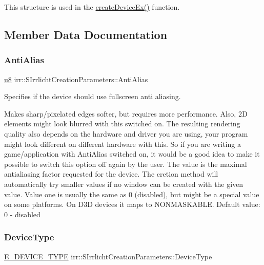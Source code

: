 This structure is used in the \hyperlink{namespaceirr_ae0a823eb5404bbf156965e7051798496}{create\+Device\+Ex()} function. 

\subsection{Member Data Documentation}
\mbox{\label{structirr_1_1SIrrlichtCreationParameters_a50602e6ae0cc3d79ca7df0aa8114e75a}} 
\subsubsection{\texorpdfstring{Anti\+Alias}{AntiAlias}}
{\footnotesize\ttfamily \hyperlink{namespaceirr_a646874f69af8ff87fc10201b0254a761}{u8} irr\+::\+S\+Irrlicht\+Creation\+Parameters\+::\+Anti\+Alias}



Specifies if the device should use fullscreen anti aliasing. 

Makes sharp/pixelated edges softer, but requires more performance. Also, 2D elements might look blurred with this switched on. The resulting rendering quality also depends on the hardware and driver you are using, your program might look different on different hardware with this. So if you are writing a game/application with Anti\+Alias switched on, it would be a good idea to make it possible to switch this option off again by the user. The value is the maximal antialiasing factor requested for the device. The cretion method will automatically try smaller values if no window can be created with the given value. Value one is usually the same as 0 (disabled), but might be a special value on some platforms. On D3D devices it maps to N\+O\+N\+M\+A\+S\+K\+A\+B\+LE. Default value\+: 0 -\/ disabled \mbox{\label{structirr_1_1SIrrlichtCreationParameters_a76520addbdf96ee3b3f00cb7f55076e5}} 
\subsubsection{\texorpdfstring{Device\+Type}{DeviceType}}
{\footnotesize\ttfamily \hyperlink{namespaceirr_ac25d94cf2e1037c7ca18ee79b3bd4505}{E\+\_\+\+D\+E\+V\+I\+C\+E\+\_\+\+T\+Y\+PE} irr\+::\+S\+Irrlicht\+Creation\+Parameters\+::\+Device\+Type}



